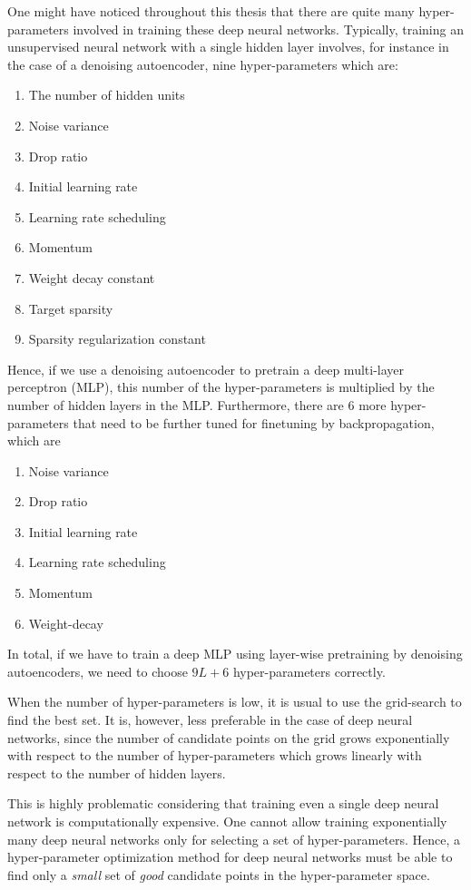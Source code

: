 \documentclass[dissertation,nocontribution,draft*]{aaltoseries}
\begin{document}
One might have noticed throughout this thesis that there are
quite many hyper-parameters involved in training these deep
neural networks. Typically, training an unsupervised neural
network with a single hidden layer involves, for instance
in the case of a denoising autoencoder, nine
hyper-parameters which are:
\begin{enumerate}
    \itemsep 0em
    \item The number of hidden units
    \item Noise variance
    \item Drop ratio
    \item Initial learning rate
    \item Learning rate scheduling
    \item Momentum
    \item Weight decay constant
    \item Target sparsity
    \item Sparsity regularization constant
\end{enumerate}
Hence, if we use a denoising autoencoder to pretrain a deep
multi-layer perceptron (MLP), this number of the
hyper-parameters is multiplied by the number of hidden layers
in the MLP. Furthermore, there are 6 more hyper-parameters
that need to be further tuned for finetuning by
backpropagation, which are
\begin{enumerate}
    \itemsep 0em
    \item Noise variance
    \item Drop ratio
    \item Initial learning rate
    \item Learning rate scheduling
    \item Momentum
    \item Weight-decay
\end{enumerate}
In total, if we have to train a deep MLP using layer-wise
pretraining by denoising autoencoders, we need to choose $9L
+ 6$ hyper-parameters correctly. 

When the number of hyper-parameters is low, it is usual to
use the grid-search to find the best set. It is, however,
less preferable in the case of deep neural networks, since
the number of candidate points on the grid grows
exponentially with respect to the number of hyper-parameters
which grows linearly with respect to the number of hidden
layers. 

This is highly problematic considering that training even a
single deep neural network is computationally expensive. One
cannot allow training exponentially many deep neural
networks only for selecting a set of hyper-parameters.
Hence, a hyper-parameter optimization method for deep neural
networks must be able to find only a \textit{small} set of
\textit{good} candidate points in the hyper-parameter space.
\end{document}
